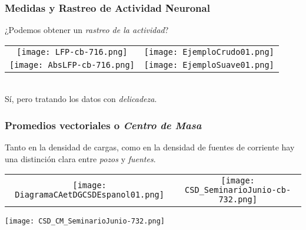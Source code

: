 \documentclass{beamer}
\begin{document}
\begin{frame}
  \frametitle{Medidas y Rastreo de Actividad Neuronal}
 ¿Podemos obtener un \emph{rastreo de la actividad}?
\center
  \begin{tabular}{cc}
    \texttt{[image: LFP-cb-716.png]} &
    \texttt{[image: EjemploCrudo01.png]} \\
    \texttt{[image: AbsLFP-cb-716.png]} &
    \texttt{[image: EjemploSuave01.png]}
  \end{tabular}\\
 Sí, pero tratando los datos con \emph{delicadeza}. 
\end{frame}





\begin{frame}
\frametitle{Promedios vectoriales o \emph{Centro de Masa}} 
Tanto en la densidad de cargas, como en la densidad de fuentes de corriente
hay una distinción clara entre \emph{pozos} y \emph{fuentes}.
\begin{center}
  \begin{tabular}{cc}
    \texttt{[image: DiagramaCAetDGCSDEspanol01.png]}   &
    \texttt{[image: CSD\_SeminarioJunio-cb-732.png]}
  \end{tabular}
\texttt{[image: CSD\_CM\_SeminarioJunio-732.png]}
\end{center}
  
\end{frame}
\end{document}
